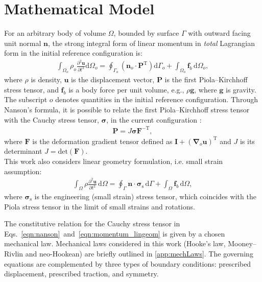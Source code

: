 \documentclass[review,3p]{elsarticle}
\newcommand{\bb}{\boldsymbol}
\begin{document}
\section{Mathematical Model}
\label{sec:math_model}
%
%
For an arbitrary body of volume $\Omega$, bounded by surface $\Gamma$ with outward facing unit normal $\bb{n}$, the strong integral form of linear momentum in \emph{total} Lagrangian form  in the initial reference configuration is:
%
\begin{eqnarray} \label{eqn:momentum_TL}
	\int_{\Omega_o} \rho_o \frac{\partial^2 \bb{u} }{\partial t^2} \text{d}\Omega_o
	=
	\oint_{\Gamma_o} \left( \bb{n}_o \cdot  \bb{P}^{\text{T}}\right)  \text{d}\Gamma_o
	+ \int_{\Omega_o}  \bb{f}_b \, \text{d}\Omega_o,
\end{eqnarray}
%
where $\rho$ is density, $\bb{u}$ is the displacement vector, $\bb{P}$ is the first Piola–Kirchhoff stress tensor,
and $\bb{f}_b$ is a body force per unit volume, e.g., $\rho \bb{g}$, where $\bb{g}$ is gravity.
The subscript $o$ denotes quantities in the initial reference configuration.
Through Nanson's formula, it is possible to relate the first Piola–Kirchhoff stress tensor with the Cauchy stress tensor, $\bb{\sigma}$, in the current configuration \cite{Gurtin1981, Gurtin2010}:
%
\begin{eqnarray} \label{eqn:nanson}
	\bb{P}=J \bb{\sigma} \bb{F}^{-\text{T}},
\end{eqnarray}
%
where $\bb{F}$ is the deformation gradient tensor defined as $\bb{I} + (\bb{\nabla}_o \bb{u})^{\text{T}}$ and $J$ is its determinant $J = \text{det}(\bb{F})$.
\\
This work also considers linear geometry formulation, i.e. small strain assumption:
%
\begin{eqnarray} \label{eqn:momentum_lingeom}
	\int_{\Omega} \rho \frac{\partial^2 \bb{u} }{\partial t^2} \, \text{d}\Omega
	=
	\oint_{\Gamma} \bb{n} \cdot \bb{\sigma}_\text{s} \,  \text{d}\Gamma
	+ \int_{\Omega}  \bb{f}_b \, \text{d}\Omega,
\end{eqnarray}
%
where $\bb{\sigma}_\text{s}$ is the engineering (small strain) stress tensor, which coincides with the Piola stress tensor in the limit of small strains and rotations.

The constitutive relation for the Cauchy stress tensor in Eqs.~\eqref{eqn:nanson}~and~\eqref{eqn:momentum_lingeom} is given by a chosen mechanical law.
Mechanical laws considered in this work (Hooke's law, Mooney–Rivlin and neo-Hookean) are briefly outlined in \ref{app:mechLaws}.
The governing equations are complemented by three types of boundary conditions: prescribed displacement, prescribed traction, and symmetry.
%
%
\end{document}
